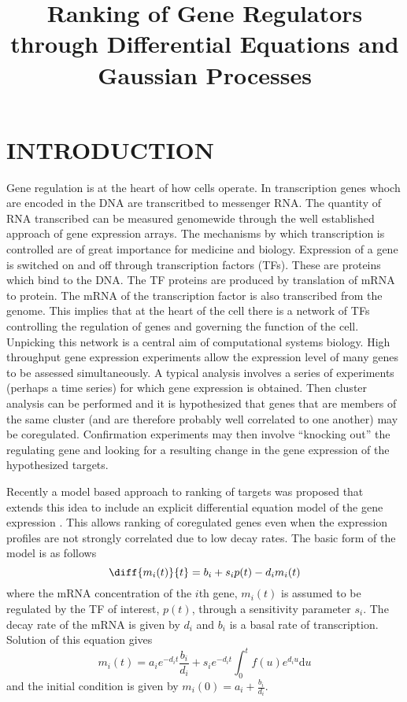 \documentclass{article}
\title{Ranking of Gene Regulators through Differential Equations and Gaussian Processes}
\begin{document}
\maketitle

\begin{abstract}
\end{abstract}

\section{INTRODUCTION}

Gene regulation is at the heart of how cells operate. In transcription
genes  whoch are  encoded in  the  DNA are  transcritbed to  messenger
RNA.  The  quantity of  RNA  transcribed  can  be measured  genomewide
through the  well established approach of gene  expression arrays. The
mechanisms  by   which  transcription  is  controlled   are  of  great
importance for medicine and biology.  Expression of a gene is switched
on  and off through  transcription factors  (TFs). These  are proteins
which bind to the DNA. The  TF proteins are produced by translation of
mRNA  to  protein.  The  mRNA  of the  transcription  factor  is  also
transcribed from  the genome.  This implies that  at the heart  of the
cell there is a network of TFs controlling the regulation of genes and
governing  the function  of  the  cell. Unpicking  this  network is  a
central  aim of  computational systems  biology. High  throughput gene
expression experiments allow the expression  level of many genes to be
assessed  simultaneously.  A typical  analysis  involves  a series  of
experiments  (perhaps a  time  series) for  which  gene expression  is
obtained.  Then   cluster  analysis  can   be  performed  and   it  is
hypothesized that genes that are  members of the same cluster (and are
therefore   probably  well   correlated   to  one   another)  may   be
coregulated.  Confirmation  experiments  may then  involve  ``knocking
out'' the  regulating gene and looking  for a resulting  change in the
gene expression of the hypothesized targets.

Recently a  model based  approach to ranking  of targets  was proposed
that extends  this idea to  include an explicit  differential equation
model of  the gene expression \cite{Barenco:}. This  allows ranking of
coregulated genes  even when the expression profiles  are not strongly
correlated due to  low decay rates. The basic form of  the model is as
follows
\[
\diff{m_i(t)}{t} = b_i + s_i p(t) - d_i m_i(t)
\]
where the mRNA concentration of the $i$th gene, $m_i(t)$ is assumed to
be  regulated by  the TF  of interest,  $p(t)$, through  a sensitivity
parameter $s_i$.  The decay  rate of  the mRNA is  given by  $d_i$ and
$b_i$  is a  basal rate  of transcription.  Solution of  this equation
gives
\[
m_i(t) = a_i e^{-d_it} \frac{b_i}{d_i} + s_i
e^{-d_it}\int_0^tf(u)e^{d_i u}\mathrm{d} u
\]
and the initial condition is given by $m_i(0)=a_i + \frac{b_i}{d_i}$. 
\end{document}
